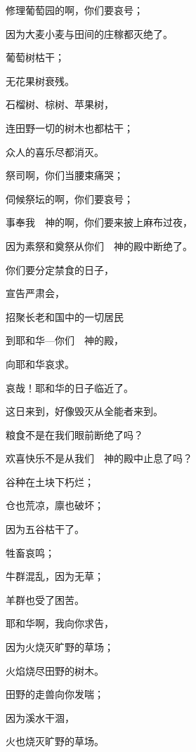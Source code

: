 {\par }{\Q 修理葡萄园的啊，你们要哀号；
\par }{\Q 因为大麦小麦与田间的庄稼都灭绝了。
\par }{\Q {}葡萄树枯干；
\par }{\Q 无花果树衰残。
\par }{\Q 石榴树、棕树、苹果树，
\par }{\Q 连田野一切的树木也都枯干；
\par }{\Q 众人的喜乐尽都消灭。
\par }{\BB \par }{\Q {}祭司啊，你们当腰束{}痛哭；
\par }{\Q 伺候祭坛的啊，你们要哀号；
\par }{\Q 事奉我　神的啊，你们要来披上麻布过夜，
\par }{\Q 因为素祭和奠祭从你们　神的殿中断绝了。
\par }{\BB \par }{\Q {}你们要分定禁食的日子，
\par }{\Q 宣告严肃会，
\par }{\Q 招聚长老和国中的一切居民
\par }{\Q 到耶和华—你们　神的殿，
\par }{\Q 向耶和华哀求。
\par }{\BB \par }{\Q {}哀哉！耶和华的日子临近了。
\par }{\Q 这日来到，好像毁灭从全能者来到。
\par }{\Q {}粮食不是在我们眼前断绝了吗？
\par }{\Q 欢喜快乐不是从我们　神的殿中止息了吗？
\par }{\BB \par }{\Q {}谷种在土块下朽烂；
\par }{\Q 仓也荒凉，廪也破坏；
\par }{\Q 因为五谷枯干了。
\par }{\Q {}牲畜哀鸣；
\par }{\Q 牛群混乱，因为无草；
\par }{\Q 羊群也受了困苦。
\par }{\BB \par }{\Q {}耶和华啊，我向你求告，
\par }{\Q 因为火烧灭旷野的草场；
\par }{\Q 火焰烧尽田野的树木。
\par }{\Q {}田野的走兽向你发喘；
\par }{\Q 因为溪水干涸，
\par }{\Q 火也烧灭旷野的草场。

}
